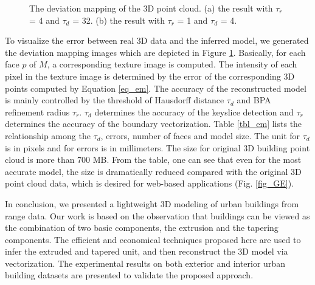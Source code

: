 \documentclass{llncs}
\begin{document}
\begin{figure} [!btp]
  \centering
  \caption{  The deviation mapping of the 3D point cloud. (a) the result with $\tau_r$ = 4 and $\tau_d$ = 32.
(b) the result with $\tau_r$ = 1 and $\tau_d$ = 4. }
  \label{fig_EM}
\end{figure}
To visualize the error between real 3D data and the inferred model,
we generated the deviation mapping images which are depicted in Figure \ref{fig_EM}.
Basically, for each face $p$ of $M$, a corresponding texture image is computed. 
The intensity of each pixel in the texture image
is determined by the error of the corresponding 3D points computed by Equation \ref{eq_em}.
The accuracy of the reconstructed model is mainly controlled by the threshold of Hausdorff distance $\tau_d$
and BPA refinement radius $\tau_r$. $\tau_d$ determines the accuracy of the keyslice detection
and $\tau_r$ determines the accuracy of the boundary vectorization.
Table \ref{tbl_em} lists the relationship among the $\tau_d$, errors, number of faces and model size.
The unit for $\tau_d$ is in pixels and for errors is in millimeters.
The size for original 3D building point cloud is more than 700 MB. From the table, one can see that even
for the most accurate model, the size is dramatically reduced compared with the original 3D point cloud data,
which is desired for web-based applications (Fig. \ref{fig_GE}).

In conclusion, we presented a lightweight 3D modeling of urban buildings from range data.
Our work is based on the observation that buildings can be
viewed as the combination of two basic components, the extrusion and
the tapering components.
The efficient and economical techniques proposed here are used to infer
the extruded and tapered unit, and then reconstruct the 3D model
via vectorization.
The experimental results on both exterior and interior urban building datasets
are presented to validate the proposed approach.



\end{document}
